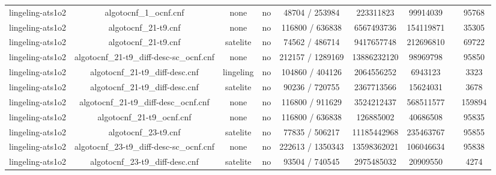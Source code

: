\begin{appendices}
\begin{table}[p]
\begin{center}
\begin{tabular}{l|cccccccc}
  lingeling-ats1o2               & algotocnf\_1\_ocnf.cnf         & none       & no    & 48704 / 253984 & 223311823 & 99914039  &            & 95768 \\ %
  lingeling-ats1o2               & algotocnf\_21-t9.cnf           & none       & no    & 116800 / 636838 & 6567493736 & 154119871 &            & 35305 \\ %
  lingeling-ats1o2               & algotocnf\_21-t9.cnf           & satelite   & no    & 74562 / 486714 & 9417657748 & 212696810 &            & 69722 \\ %
  lingeling-ats1o2               & algotocnf\_21-t9\_diff-desc-sc\_ocnf.cnf & none       & no    & 212157 / 1289169 & 13886232120 & 98969798  &            & 95850 \\ %
  lingeling-ats1o2               & algotocnf\_21-t9\_diff-desc.cnf & lingeling  & no    & 104860 / 404126 & 2064556252 & 6943123   &            & 3323 \\ %
  lingeling-ats1o2               & algotocnf\_21-t9\_diff-desc.cnf & satelite   & no    & 90236 / 720755 & 2367713566 & 15624031  &            & 3678 \\ %
  lingeling-ats1o2               & algotocnf\_21-t9\_diff-desc\_ocnf.cnf & none       & no    & 116800 / 911629 & 3524212437 & 568511577 &            & 159894 \\ %
  lingeling-ats1o2               & algotocnf\_21-t9\_ocnf.cnf     & none       & no    & 116800 / 636838 & 126885002 & 40686508  &            & 95835 \\ %
  lingeling-ats1o2               & algotocnf\_23-t9.cnf           & satelite   & no    & 77835 / 506217 & 11185442968 & 235463767 &            & 95855 \\ %
  lingeling-ats1o2               & algotocnf\_23-t9\_diff-desc-sc\_ocnf.cnf & none       & no    & 222613 / 1350343 & 13598362021 & 106046634 &            & 95838 \\ %
  lingeling-ats1o2               & algotocnf\_23-t9\_diff-desc.cnf & satelite   & no    & 93504 / 740545 & 2975485032 & 20909550  &            & 4274 \\ %

\end{tabular}
\end{center}
\end{table}
\end{appendices}
